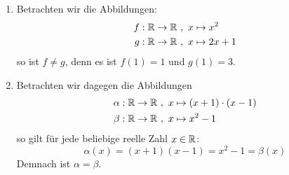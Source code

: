 \begin{bsp} \label{bsp:abbgleich} \quad
    \begin{enumerate}
        \item Betrachten wir die Abbildungen: 
        \begin{align*}
            f: \mathbb R \to \mathbb R\ &,\ x \mapsto x^2 \\
            g: \mathbb R \to \mathbb R\ &,\ x \mapsto 2x+1
        \end{align*}
        so ist $f \neq g$, denn es ist $f(1)=1$ und $g(1)=3$.
        \item Betrachten wir dagegen die Abbildungen
        \begin{align*}
            \alpha: \mathbb R \to \mathbb R\ &,\ x \mapsto (x+1)\cdot (x-1) \\
            \beta: \mathbb R \to \mathbb R\ &,\ x \mapsto  x^2-1
        \end{align*}
        so gilt für jede beliebige reelle Zahl $x\in \mathbb R$:
            \[ \alpha(x) = (x+1)(x-1) = x^2-1 = \beta(x) \]
        Demnach ist $\alpha=\beta$.
    \end{enumerate}
\end{bsp}


